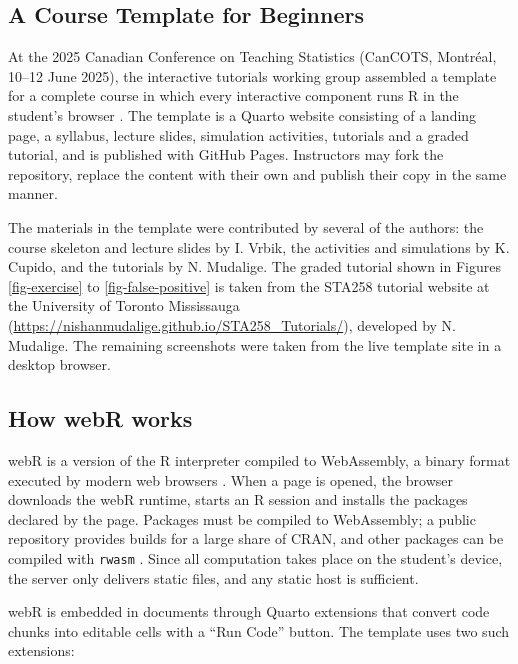 \documentclass[
  12pt]{article}
\begin{document}
\subsection{A Course Template for
Beginners}\label{a-course-template-for-beginners}

At the 2025 Canadian Conference on Teaching Statistics (CanCOTS,
Montréal, 10--12 June 2025), the interactive tutorials working group
assembled a template for a complete course in which every interactive
component runs R in the student's browser \citep{cancotsrepo}. The
template is a Quarto website \citep{quarto} consisting of a landing
page, a syllabus, lecture slides, simulation activities, tutorials and a
graded tutorial, and is published with GitHub Pages. Instructors may
fork the repository, replace the content with their own and publish
their copy in the same manner.

The materials in the template were contributed by several of the
authors: the course skeleton and lecture slides by I. Vrbik, the
activities and simulations by K. Cupido, and the tutorials by N.
Mudalige. The graded tutorial shown in Figures \ref{fig-exercise} to
\ref{fig-false-positive} is taken from the STA258 tutorial website at
the University of Toronto Mississauga
(\url{https://nishanmudalige.github.io/STA258_Tutorials/}), developed by
N. Mudalige. The remaining screenshots were taken from the live template
site in a desktop browser.

\subsection{How webR works}\label{sec-webr-how}

webR is a version of the R interpreter compiled to WebAssembly, a binary
format executed by modern web browsers \citep{webRdocs}. When a page is
opened, the browser downloads the webR runtime, starts an R session and
installs the packages declared by the page. Packages must be compiled to
WebAssembly; a public repository provides builds for a large share of
CRAN, and other packages can be compiled with \texttt{rwasm}
\citep{webRpackages}. Since all computation takes place on the student's
device, the server only delivers static files, and any static host is
sufficient.

webR is embedded in documents through Quarto extensions that convert
code chunks into editable cells with a ``Run Code'' button. The template
uses two such extensions:
\end{document}
